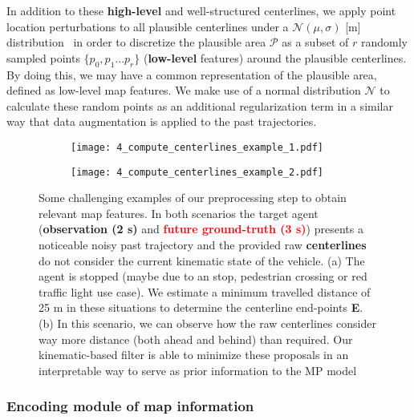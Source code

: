 In addition to these \textbf{high-level} and well-structured centerlines, we apply point location perturbations to all plausible centerlines under a $\mathcal{N}(\mu, \sigma)$ [m] distribution~\cite{ye2021tpcn} in order to discretize the plausible area $\mathcal{P}$ as a subset of $r$ randomly sampled points $\{p_0 , p_1 ... p_r\}$ (\textbf{low-level} features) around the plausible centerlines. By doing this, we may have a common representation of the plausible area, defined as low-level map features. We make use of a normal distribution $\mathcal{N}$ to calculate these random points as an additional regularization term in a similar way that data augmentation is applied to the past trajectories. 

\begin{figure}[t!]
	\begin{subfigure}{0.5\textwidth}
		\texttt{[image: 4\_compute\_centerlines\_example\_1.pdf]}

	\end{subfigure}
	\hfill
	\begin{subfigure}{0.5\textwidth}
		\texttt{[image: 4\_compute\_centerlines\_example\_2.pdf]}

	\end{subfigure}
	
	\caption{Some challenging examples of our preprocessing step to obtain relevant map features. In both scenarios the target agent (\textbf{\textcolor{YellowOrange}{observation (2 s)}} and \textbf{\textcolor{red}{future ground-truth (3 s)}}) presents a noticeable noisy past trajectory and the provided raw \textbf{centerlines} do not consider the current kinematic state of the vehicle. (a) The agent is stopped (maybe due to an stop, pedestrian crossing or red traffic light use case). We estimate a minimum travelled distance of 25 m in these situations to determine the centerline end-points \textbf{E}. (b) In this scenario, we can observe how the raw centerlines consider way more distance (both ahead and behind) than required. Our kinematic-based filter is able to minimize these proposals in an interpretable way to serve as prior information to the MP model
	}
	\label{fig:4_efficient_baselines_hdmap_filtered_examples}
\end{figure}

\subsubsection{Encoding module of map information}
\label{subsubsec:4_efficient_baselines_encoding_map}


